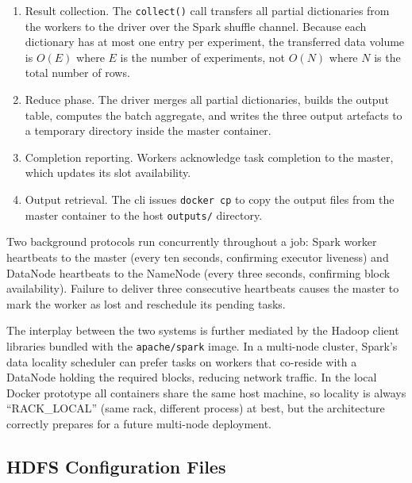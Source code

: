 \begin{sloppypar}
\begin{enumerate}
    \item Result collection.  The \texttt{collect()} call transfers all partial
          dictionaries from the workers to the driver over the Spark shuffle channel.
          Because each dictionary has at most one entry per experiment, the transferred data
          volume is $O(E)$ where $E$ is the number of experiments, not $O(N)$ where $N$ is
          the total number of rows.

    \item Reduce phase.  The driver merges all partial dictionaries, builds the
          output table, computes the batch aggregate, and writes the three output
          artefacts to a temporary directory inside the master container.

    \item Completion reporting.  Workers acknowledge task completion to the master,
          which updates its slot availability.

    \item Output retrieval.  The \gls{cli} issues \texttt{docker cp} to copy the
          output files from the master container to the host \texttt{outputs/} directory.
\end{enumerate}
\end{sloppypar}

Two background protocols run concurrently throughout a job: Spark worker heartbeats to the
master (every ten seconds, confirming executor liveness) and DataNode heartbeats to the
NameNode (every three seconds, confirming block availability).  Failure to deliver three
consecutive heartbeats causes the master to mark the worker as lost and reschedule its
pending tasks.

The interplay between the two systems is further mediated by the Hadoop client libraries bundled with
the \texttt{apache/spark} image.  In a multi-node cluster, Spark's data
locality scheduler can prefer tasks on workers that co-reside with a DataNode holding the
required blocks, reducing network traffic.  In the local Docker prototype all containers share
the same host machine, so locality is always ``RACK\_LOCAL'' (same rack, different process) at
best, but the architecture correctly prepares for a future multi-node deployment.

\subsection{HDFS Configuration Files}
\label{subsec:hdfs-conf}

